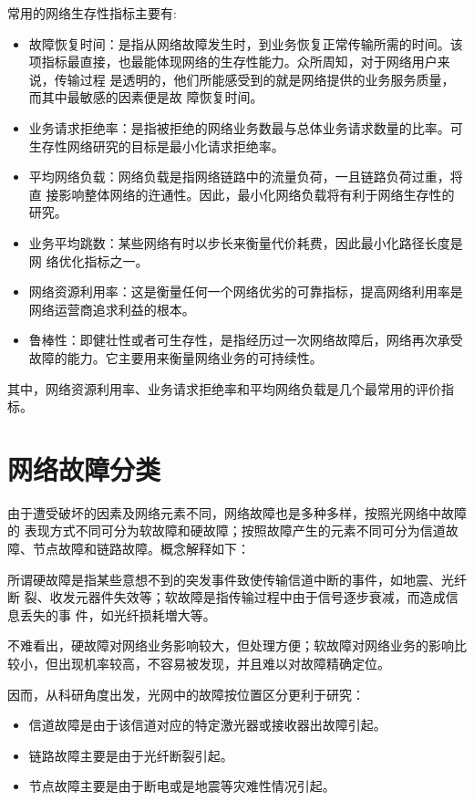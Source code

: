 常用的网络生存性指标主要有:
\begin{itemize}
  \item 故障恢复时间：是指从网络故障发生时，到业务恢复正常传输所需的时间。该 项指标最直接，也最能体现网络的生存性能力。众所周知，对于网络用户来说，传输过程 是透明的，他们所能感受到的就是网络提供的业务服务质量，而其中最敏感的因素便是故 障恢复时间。
  \item 业务请求拒绝率：是指被拒绝的网络业务数最与总体业务请求数量的比率。可生存性网络研究的目标是最小化请求拒绝率。
  \item 平均网络负载：网络负载是指网络链路中的流量负荷，一且链路负荷过重，将直 接影响整体网络的迕通性。因此，最小化网络负载将有利于网络生存性的研究。
  \item 业务平均跳数：某些网络有时以步长来衡量代价耗费，因此最小化路径长度是网 络优化指标之一。
  \item 网络资源利用率：这是衡量任何一个网络优劣的可靠指标，提高网络利用率是网络运营商追求利益的根本。
  \item 鲁棒性：即健壮性或者可生存性，是指经历过一次网络故障后，网络再次承受故障的能力。它主要用来衡量网络业务的可持续性。
\end{itemize}
其中，网络资源利用率、业务请求拒绝率和平均网络负载是几个最常用的评价指标。


\section{网络故障分类}
由于遭受破坏的因素及网络元素不同，网络故障也是多种多样，按照光网络中故障的 表现方式不同可分为软故障和硬故障；按照故障产生的元素不同可分为信道故障、节点故障和链路故障。概念解释如下：

所谓硬故障是指某些意想不到的突发事件致使传输信道中断的事件，如地震、光纤断 裂、收发元器件失效等；软故障是指传输过程中由于信号逐步衰减，而造成信息丢失的事 件，如光纤损耗増大等。

不难看出，硬故障对网络业务影响较大，但处理方便；软故障对网络业务的影响比较小，但出现机率较高，不容易被发现，并且难以对故障精确定位。

因而，从科研角度出发，光网中的故障按位置区分更利于研究：
\begin{itemize}
\item 信道故障是由于该信道对应的特定激光器或接收器出故障引起。
\item 链路故障主要是由于光纤断裂引起。
\item 节点故障主要是由于断电或是地震等灾难性情况引起。
\end{itemize}

